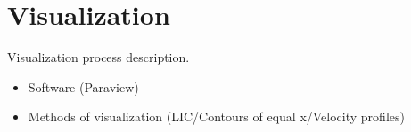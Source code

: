 \section{Visualization}
Visualization process description.
\begin{itemize}
 \item Software (Paraview)
 \item Methods of visualization (LIC/Contours of equal x/Velocity profiles)
\end{itemize}

